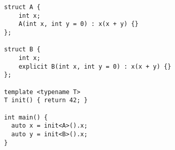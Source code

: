 \begin{lstlisting}[title=\href{https://godbolt.org/z/yfxxRN}{\texttt{godbolt.org/z/yfxxRN}}]
struct A {
    int x;
    A(int x, int y = 0) : x(x + y) {}
};

struct B {
    int x;
    explicit B(int x, int y = 0) : x(x + y) {}
};

template <typename T>
T init() { return 42; }

int main() {
  auto x = init<A>().x;
  auto y = init<B>().x; 
}
\end{lstlisting}
